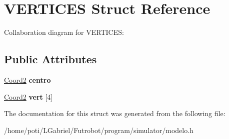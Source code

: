 \hypertarget{structVERTICES}{}\section{V\+E\+R\+T\+I\+C\+ES Struct Reference}
\label{structVERTICES}


Collaboration diagram for V\+E\+R\+T\+I\+C\+ES\+:
\subsection*{Public Attributes}
\begin{DoxyCompactItemize}
\item 
\hyperlink{structCoord2}{Coord2} {\bfseries centro}\hypertarget{structVERTICES_ad547727b93f2b6919bf409d2c90a0175}{}\label{structVERTICES_ad547727b93f2b6919bf409d2c90a0175}

\item 
\hyperlink{structCoord2}{Coord2} {\bfseries vert} \mbox{[}4\mbox{]}\hypertarget{structVERTICES_aa89895a0f51858c8de1d604cbfc9ed0f}{}\label{structVERTICES_aa89895a0f51858c8de1d604cbfc9ed0f}

\end{DoxyCompactItemize}


The documentation for this struct was generated from the following file\+:\begin{DoxyCompactItemize}
\item 
/home/poti/\+L\+Gabriel/\+Futrobot/program/simulator/modelo.\+h\end{DoxyCompactItemize}
